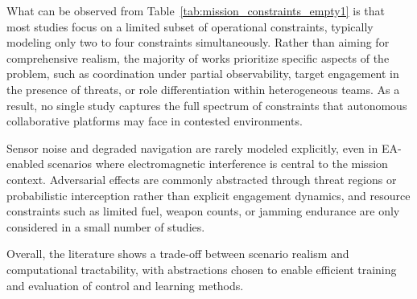 What can be observed from Table~\ref{tab:mission_constraints_empty1} is that most studies focus on a limited subset of operational constraints, typically modeling only two to four constraints simultaneously. Rather than aiming for comprehensive realism, the majority of works prioritize specific aspects of the problem, such as coordination under partial observability, target engagement in the presence of threats, or role differentiation within heterogeneous teams. As a result, no single study captures the full spectrum of constraints that autonomous collaborative platforms may face in contested environments.

Sensor noise and degraded navigation are rarely modeled explicitly, even in EA-enabled scenarios where electromagnetic interference is central to the mission context. Adversarial effects are commonly abstracted through threat regions or probabilistic interception rather than explicit engagement dynamics, and resource constraints such as limited fuel, weapon counts, or jamming endurance are only considered in a small number of studies.

Overall, the literature shows a trade-off between scenario realism and computational tractability, with abstractions chosen to enable efficient training and evaluation of control and learning methods. 

